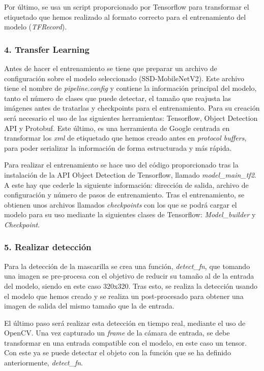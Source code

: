 Por último, se usa un script proporcionado por Tensorflow para transformar el etiquetado que hemos realizado al formato correcto para el entrenamiento del modelo (\textit{TFRecord}).

\vspace{-0.5cm}
\subsubsection*{4. Transfer Learning}
\vspace{-0.7cm}
Antes de hacer el entrenamiento se tiene que preparar un archivo de configuración sobre el modelo seleccionado (SSD-MobileNetV2). Este archivo tiene el nombre de \textit{pipeline.config} y contiene la información principal del modelo, tanto el número de clases que puede detectar, el tamaño que reajusta las imágenes antes de tratarlas y checkpoints para el entrenamiento. Para su creación será necesario el uso de las siguientes herramientas: Tensorflow, Object Detection API y Protobuf. Este último, es una herramienta de Google centrada en transformar los \textit{xml} de etiquetado que hemos creado antes en \textit{protocol buffers}, para poder serializar la información de forma estructurada y más rápida.

Para realizar el entrenamiento se hace uso del código proporcionado tras la instalación de la API Object Detection de Tensorflow, llamado \textit{model\_main\_tf2}. A este hay que cederle la siguiente información: dirección de salida, archivo de configuración y número de pasos de entrenamiento. Tras el entrenamiento, se obtienen unos archivos llamados \textit{checkpoints} con los que se podrá cargar el modelo para su uso mediante la siguientes clases de Tensorflow: \textit{Model\_builder} y \textit{Checkpoint}.

\vspace{-0.5cm}
\subsubsection*{5. Realizar detección}
\vspace{-0.7cm}
Para la detección de la mascarilla se crea una función, \textit{detect\_fn}, que tomando una imagen se pre-procesa con el objetivo de  reducir su tamaño al de la entrada del modelo, siendo en este caso 320x320. Tras esto, se realiza la detección usando el modelo que hemos creado y se realiza un post-procesado para obtener una imagen de salida del mismo tamaño que la de entrada.

El último paso será realizar esta detección en tiempo real, mediante el uso de OpenCV. Una vez capturado un \textit{frame} de la cámara de entrada, se debe transformar en una entrada compatible con el modelo, en este caso un tensor. Con este ya se puede detectar el objeto con la función que se ha definido anteriormente, \textit{detect\_fn}. 

